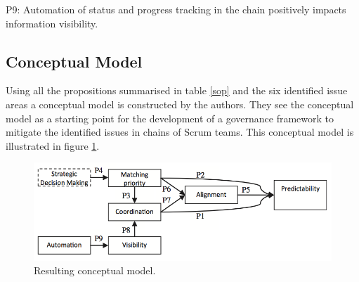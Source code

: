 \begin{fancyquotes}
P9: Automation of status and progress tracking in the chain positively impacts information visibility.
\end{fancyquotes}

\subsection{Conceptual Model}
\label{conceptualmodel}

Using all the propositions summarised in table \ref{sop} and the six identified issue areas a conceptual model is constructed by the authors. They see the conceptual model as a starting point for the development of a governance framework to mitigate the identified issues in chains of Scrum teams. This conceptual model is illustrated in figure \ref{rcm}.

\begin{figure}[H]
\centering
\includegraphics[width=150mm]{images/conceptual_model.png}
\caption{Resulting conceptual model.}
\label{rcm}
\end{figure}

